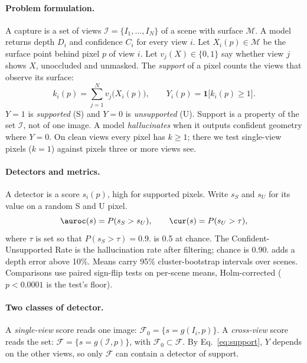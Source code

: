 \documentclass[10pt,twocolumn,letterpaper]{article}
\begin{document}
\paragraph{Problem formulation.}
A capture is a set of views $\mathcal{I}=\{I_1,\dots,I_N\}$ of a scene with surface $\mathcal{M}$. A model returns depth $D_i$ and confidence $C_i$ for every view $i$. Let $X_i(p)\in\mathcal{M}$ be the surface point behind pixel $p$ of view $i$. Let $v_j(X)\in\{0,1\}$ say whether view $j$ shows $X$, unoccluded and unmasked. The \emph{support} of a pixel counts the views that observe its surface:
\begin{equation}
k_i(p)=\sum_{j=1}^{N} v_j\big(X_i(p)\big),\qquad Y_i(p)=\mathbf{1}\big[k_i(p)\ge 1\big].
\label{eq:support}
\end{equation}
$Y=1$ is \emph{supported} (S) and $Y=0$ is \emph{unsupported} (U). Support is a property of the set $\mathcal{I}$, not of one image. A model \emph{hallucinates} when it outputs confident geometry where $Y=0$. On clean views every pixel has $k\ge1$; there we test single-view pixels ($k=1$) against pixels three or more views see.

\paragraph{Detectors and metrics.}
A detector is a score $s_i(p)$, high for supported pixels. Write $s_S$ and $s_U$ for its value on a random S and U pixel.
\begin{equation}
\auroc(s)=P(s_S>s_U),\qquad \cur(s)=P(s_U>\tau),
\label{eq:metrics}
\end{equation}
where $\tau$ is set so that $P(s_S>\tau)=0.9$. \auroc{} is 0.5 at chance. The Confident-Unsupported Rate \cur{} is the hallucination rate after filtering; chance is 0.90. \curerr{} adds a depth error above 10\%. Means carry 95\% cluster-bootstrap intervals over scenes. Comparisons use paired sign-flip tests on per-scene means, Holm-corrected ($p<0.0001$ is the test's floor).

\paragraph{Two classes of detector.}
A \emph{single-view} score reads one image: $\mathcal{F}_0=\{s=g(I_i,p)\}$. A \emph{cross-view} score reads the set: $\mathcal{F}=\{s=g(\mathcal{I},p)\}$, with $\mathcal{F}_0\subset\mathcal{F}$. By Eq.~\eqref{eq:support}, $Y$ depends on the other views, so only $\mathcal{F}$ can contain a detector of support.
\end{document}

